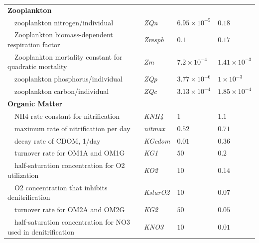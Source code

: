 \documentclass[letterpaper,12pt,oneside]{article}\usepackage[]{graphicx}\usepackage[]{color}
\begin{document}
\begin{table}[!tbp]
{\begin{center}
\begin{tabular}{llll}
\hline
{\bfseries Zooplankton}&&&\tabularnewline
~~zooplankton nitrogen/individual&\textit{ZQn}&$6.95\times 10^{-5}$&$0.18$\tabularnewline
~~Zooplankton biomass-dependent respiration factor&\textit{Zrespb}&$0.1$&$0.17$\tabularnewline
~~Zooplankton mortality constant for quadratic mortality&\textit{Zm}&$7.2\times 10^{-4}$&$1.41\times 10^{-3}$\tabularnewline
~~zooplankton phosphorus/individual&\textit{ZQp}&$3.77\times 10^{-6}$&$1\times 10^{-3}$\tabularnewline
~~zooplankton carbon/individual&\textit{ZQc}&$3.13\times 10^{-4}$&$1.85\times 10^{-4}$\tabularnewline
\hline
{\bfseries Organic Matter}&&&\tabularnewline
~~NH4 rate constant for nitrification&\textit{KNH4}&$1$&$1.1$\tabularnewline
~~maximum rate of nitrification per day&\textit{nitmax}&$0.52$&$0.71$\tabularnewline
~~decay rate of CDOM, 1/day&\textit{KGcdom}&$0.01$&$0.36$\tabularnewline
~~turnover rate for OM1A and OM1G&\textit{KG1}&$50$&$0.2$\tabularnewline
~~half-saturation concentration for O2 utilization&\textit{KO2}&$10$&$0.14$\tabularnewline
~~O2 concentration that inhibits denitrification&\textit{KstarO2}&$10$&$0.07$\tabularnewline
~~turnover rate for OM2A and OM2G&\textit{KG2}&$50$&$0.05$\tabularnewline
~~half-saturation concentration for NO3 used in denitrification&\textit{KNO3}&$10$&$0.01$\tabularnewline
\hline
\end{tabular}\end{center}}

\end{table}
\end{document}
